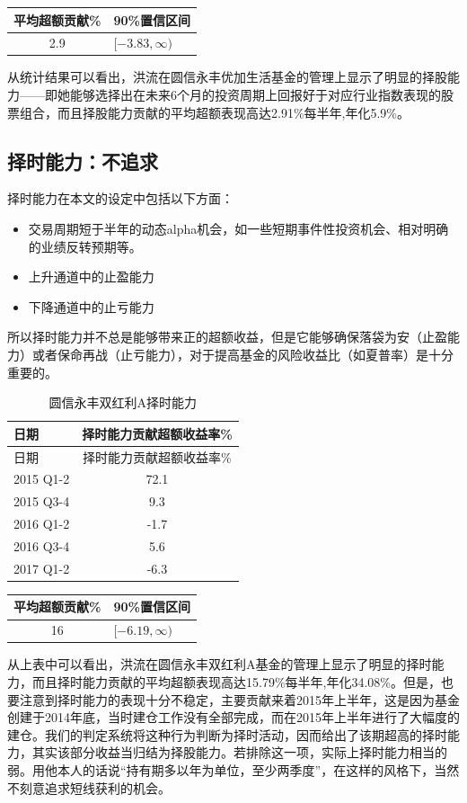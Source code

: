 \documentclass[hyperref,]{ctexart}
\providecommand{\tightlist}{%
  \setlength{\itemsep}{0pt}\setlength{\parskip}{0pt}}
\begin{document}
\begin{longtable}[]{@{}cl@{}}
\toprule
平均超额贡献\% & 90\%置信区间\tabularnewline
\midrule
\endhead
2.9 & \([-3.83,\infty)\)\tabularnewline
\bottomrule
\end{longtable}

从统计结果可以看出，洪流在圆信永丰优加生活基金的管理上显示了明显的择股能力------即她能够选择出在未来6个月的投资周期上回报好于对应行业指数表现的股票组合，而且择股能力贡献的平均超额表现高达2.91\%每半年,年化5.9\%。

\subsection{择时能力：不追求}

择时能力在本文的设定中包括以下方面：

\begin{itemize}
\tightlist
\item
  交易周期短于半年的动态alpha机会，如一些短期事件性投资机会、相对明确的业绩反转预期等。
\item
  上升通道中的止盈能力
\item
  下降通道中的止亏能力
\end{itemize}

所以择时能力并不总是能够带来正的超额收益，但是它能够确保落袋为安（止盈能力）或者保命再战（止亏能力），对于提高基金的风险收益比（如夏普率）是十分重要的。

\begin{longtable}[]{@{}lc@{}}
\caption{圆信永丰双红利A择时能力}\tabularnewline
\toprule
日期 & 择时能力贡献超额收益率\%\tabularnewline
\midrule
\endfirsthead
\toprule
日期 & 择时能力贡献超额收益率\%\tabularnewline
\midrule
\endhead
2015 Q1-2 & 72.1\tabularnewline
2015 Q3-4 & 9.3\tabularnewline
2016 Q1-2 & -1.7\tabularnewline
2016 Q3-4 & 5.6\tabularnewline
2017 Q1-2 & -6.3\tabularnewline
\bottomrule
\end{longtable}

\begin{longtable}[]{@{}cl@{}}
\toprule
平均超额贡献\% & 90\%置信区间\tabularnewline
\midrule
\endhead
16 & \([-6.19,\infty)\)\tabularnewline
\bottomrule
\end{longtable}

从上表中可以看出，洪流在圆信永丰双红利A基金的管理上显示了明显的择时能力，而且择时能力贡献的平均超额表现高达15.79\%每半年,年化34.08\%。但是，也要注意到择时能力的表现十分不稳定，主要贡献来着2015年上半年，这是因为基金创建于2014年底，当时建仓工作没有全部完成，而在2015年上半年进行了大幅度的建仓。我们的判定系统将这种行为判断为择时活动，因而给出了该期超高的择时能力，其实该部分收益当归结为择股能力。若排除这一项，实际上择时能力相当的弱。用他本人的话说``持有期多以年为单位，至少两季度''，在这样的风格下，当然不刻意追求短线获利的机会。
\end{document}

